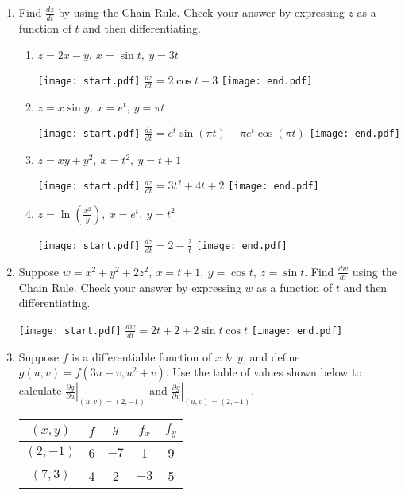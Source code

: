 \documentclass[12pt]{article}
\begin{document}
\begin{enumerate}

\item Find $\frac{d z}{d t}$ by using the Chain Rule.  Check your answer by expressing $z$ as a function of $t$ and then differentiating. 
 
\begin{enumerate}

\item $z=2x-y,\ x=\sin{t},\ y=3t$ 

\texttt{[image: start.pdf]}
{{$\frac{dz}{dt}=2\cos{t}-3$}}
\texttt{[image: end.pdf]}


\item $z=x\sin{y},\ x=e^t,\ y=\pi t$ 

\texttt{[image: start.pdf]}
{{$\frac{dz}{dt}=e^{t}\sin{(\pi t)}+\pi e^{t}\cos{(\pi t)}$}}
\texttt{[image: end.pdf]}


\item $z=xy+y^2,\ x=t^2,\ y=t+1$ 

\texttt{[image: start.pdf]}
{{$\frac{dz}{dt}=3t^2+4t+2$}}
\texttt{[image: end.pdf]}


\item $z=\ln{\left(\frac{x^2}{y}\right)},\ x=e^{t},\ y=t^2$ 

\texttt{[image: start.pdf]}
{{$\frac{dz}{dt}=2-\frac{2}{t}$}}
\texttt{[image: end.pdf]}


\end{enumerate}

\item  Suppose $w=x^2+y^2+2z^2,\ x=t+1,\ y=\cos{t},\ z=\sin{t}$.   Find $\frac{d w}{d t}$ using the Chain Rule.  Check your answer by expressing $w$ as a function of $t$ and then differentiating.

\texttt{[image: start.pdf]}
{{$\frac{dw}{dt}=2t+2+2\sin{t}\cos{t}$}}
\texttt{[image: end.pdf]}


\item Suppose $f$ is a differentiable function of $x$ \& $y$, and define $g(u,v)=f(3u-v,u^2+v)$.  Use the table of values shown below to calculate $\left.\frac{\partial g}{\partial u}\right|_{(u,v)=(2,-1)}$ and $\left.\frac{\partial g}{\partial v}\right|_{(u,v)=(2,-1)}$.

\begin{center}
\begin{tabular}{|c|c|c|c|c|}
\hline
$(x,y)$& $f$ & $g$ & $f_x$ & $f_y$\\
\hline
$(2,-1)$ & 6 & $-7$ & 1 & 9\\
\hline
$(7,3)$ & 4 & 2 & $-3$ & 5\\
\hline
\end{tabular}
\end{center}


\end{enumerate}
\end{document}
